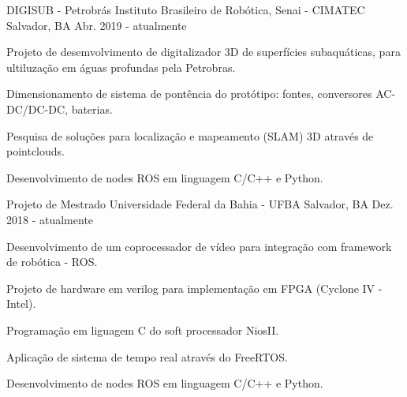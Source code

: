 

\begin{cventries}

  \cventry
    {DIGISUB - Petrobrás} %
    {Instituto Brasileiro de Robótica, Senai - CIMATEC} %
    {Salvador, BA} %
    {Abr. 2019 - atualmente} %
    {
      \begin{cvitems} %
        \item {Projeto de desemvolvimento de digitalizador 3D de superfícies subaquáticas, para ultiluzação em águas profundas pela Petrobras.}
        \item {Dimensionamento de sistema de pontência do protótipo: fontes, conversores AC-DC/DC-DC, baterias.}
        \item {Pesquisa de soluções para localização e mapeamento (SLAM) 3D através de pointclouds.}
        \item {Desenvolvimento de nodes ROS em linguagem C/C++ e Python.}
      \end{cvitems}
    }


  \cventry
    {Projeto de Mestrado} %
    {Universidade Federal da Bahia - UFBA} %
    {Salvador, BA} %
    {Dez. 2018 - atualmente} %
    {
      \begin{cvitems} %
        \item {Desenvolvimento de um coprocessador de vídeo para integração com framework de robótica - ROS.}
        \item {Projeto de hardware em verilog para implementação em FPGA (Cyclone IV - Intel).}
        \item {Programação em liguagem C do soft processador NiosII.}
        \item {Aplicação de sistema de tempo real através do FreeRTOS.}
        \item {Desenvolvimento de nodes ROS em linguagem C/C++ e Python.}
      \end{cvitems}
    }


\end{cventries}
